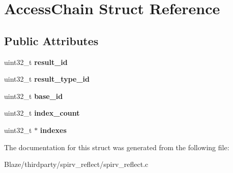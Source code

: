 \hypertarget{structAccessChain}{}\section{Access\+Chain Struct Reference}
\label{structAccessChain}
\subsection*{Public Attributes}
\begin{DoxyCompactItemize}
\item 
\mbox{\label{structAccessChain_a3dd052d8b94ec3412f067d54c5a3c99d}} 
uint32\+\_\+t {\bfseries result\+\_\+id}
\item 
\mbox{\label{structAccessChain_ad16ef2b3885293317ddb4541b58437f7}} 
uint32\+\_\+t {\bfseries result\+\_\+type\+\_\+id}
\item 
\mbox{\label{structAccessChain_a5635bacbfa6be2a7120d49c4bb5f52f3}} 
uint32\+\_\+t {\bfseries base\+\_\+id}
\item 
\mbox{\label{structAccessChain_a8bf0aac7db19792e558c462553002d5b}} 
uint32\+\_\+t {\bfseries index\+\_\+count}
\item 
\mbox{\label{structAccessChain_aa5d79dada868c03a7b7fc4ec44028f70}} 
uint32\+\_\+t $\ast$ {\bfseries indexes}
\end{DoxyCompactItemize}


The documentation for this struct was generated from the following file\+:\begin{DoxyCompactItemize}
\item 
Blaze/thirdparty/spirv\+\_\+reflect/spirv\+\_\+reflect.\+c\end{DoxyCompactItemize}
